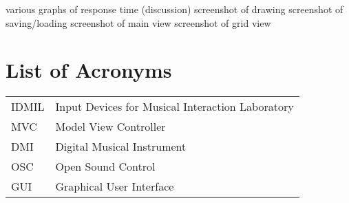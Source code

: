 \documentclass [12pt,letterpaper]{report}
\begin{document}
\tableofcontents
\listoffigures
	various graphs of response time (discussion)
	screenshot of drawing
	screenshot of saving/loading
	screenshot of main view
	screenshot of grid view
\listoftables

\newpage
\chapter*{List of Acronyms}

\begin{longtable}{ll}
  IDMIL	& 	Input Devices for Musical Interaction Laboratory\\ 
  MVC 	& 	Model View Controller\\
  DMI 	& 	Digital Musical Instrument\\
  OSC 	& 	Open Sound Control\\
  GUI		& 	Graphical User Interface
\end{longtable}

\cleardoublepage
{}

%
%
\typeout{}

%
\typeout{}

%
\typeout{}

%
\typeout{}

%
\typeout{}




%
%

\typeout{}
\begin{singlespace}
  
  
\end{singlespace}
\end{document}
